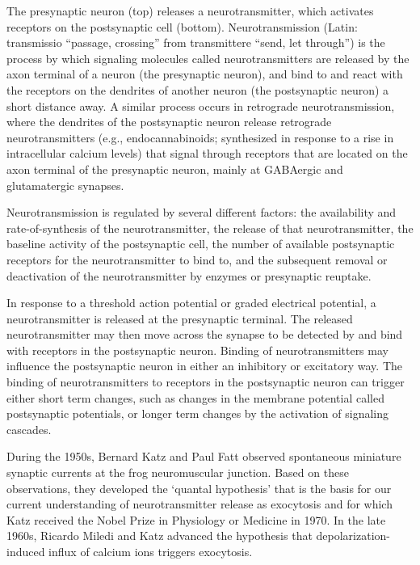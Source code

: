 \documentclass[]{book}
\begin{document}
The presynaptic neuron (top) releases a neurotransmitter, which activates receptors on the postsynaptic cell (bottom).
Neurotransmission (Latin: transmissio ``passage, crossing'' from transmittere ``send, let through'') is the process by which signaling molecules called neurotransmitters are released by the axon terminal of a neuron (the presynaptic neuron), and bind to and react with the receptors on the dendrites of another neuron (the postsynaptic neuron) a short distance away. A similar process occurs in retrograde neurotransmission, where the dendrites of the postsynaptic neuron release retrograde neurotransmitters (e.g., endocannabinoids; synthesized in response to a rise in intracellular calcium levels) that signal through receptors that are located on the axon terminal of the presynaptic neuron, mainly at GABAergic and glutamatergic synapses.

Neurotransmission is regulated by several different factors: the availability and rate-of-synthesis of the neurotransmitter, the release of that neurotransmitter, the baseline activity of the postsynaptic cell, the number of available postsynaptic receptors for the neurotransmitter to bind to, and the subsequent removal or deactivation of the neurotransmitter by enzymes or presynaptic reuptake.

In response to a threshold action potential or graded electrical potential, a neurotransmitter is released at the presynaptic terminal. The released neurotransmitter may then move across the synapse to be detected by and bind with receptors in the postsynaptic neuron. Binding of neurotransmitters may influence the postsynaptic neuron in either an inhibitory or excitatory way. The binding of neurotransmitters to receptors in the postsynaptic neuron can trigger either short term changes, such as changes in the membrane potential called postsynaptic potentials, or longer term changes by the activation of signaling cascades.

During the 1950s, Bernard Katz and Paul Fatt observed spontaneous miniature synaptic currents at the frog neuromuscular junction. Based on these observations, they developed the `quantal hypothesis' that is the basis for our current understanding of neurotransmitter release as exocytosis and for which Katz received the Nobel Prize in Physiology or Medicine in 1970. In the late 1960s, Ricardo Miledi and Katz advanced the hypothesis that depolarization-induced influx of calcium ions triggers exocytosis.
\end{document}
